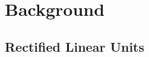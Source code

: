\documentclass{article}
\begin{document}



\vspace{-1.5em}

\section{Background}
\subsection{Rectified Linear Units}
\label{sec:format}
\end{document}
